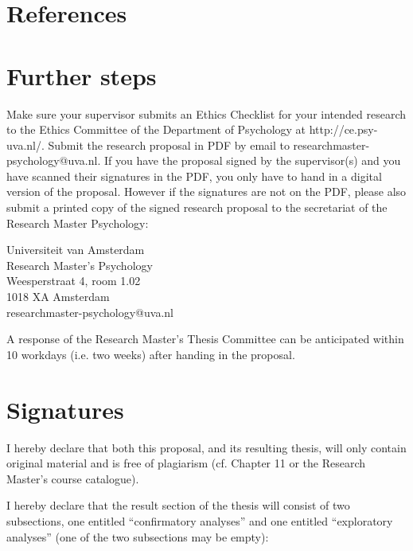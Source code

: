 \documentclass[12pt,a4paper]{article}\usepackage[]{graphicx}\usepackage[]{color}
\begin{document}
\section{References}


\section{Further steps}
Make sure your supervisor submits an Ethics Checklist for your intended research to the Ethics Committee of the Department of Psychology at http://ce.psy-uva.nl/. Submit the research proposal in PDF by email to researchmaster-psychology@uva.nl. 
If you have the proposal signed by the supervisor(s) and you have scanned their signatures in the PDF, you only have to hand in a digital version of the proposal. However if the signatures are not on the PDF, please also submit a printed copy of the signed research proposal to the secretariat of the Research Master Psychology:
\vspace{\baselineskip}

\noindent
Universiteit van Amsterdam \\
Research Master’s Psychology \\
Weesperstraat 4, room 1.02 \\
1018 XA Amsterdam \\
researchmaster-psychology@uva.nl
\vspace{\baselineskip}

\noindent
A response of the Research Master's Thesis Committee can be anticipated within 10 workdays (i.e. two weeks) after handing in the proposal. 

\section{Signatures}
\makebox[0pt][l]{$\square$}\raisebox{.15ex}{\hspace{0.1em}$\checkmark$} I hereby declare that both this proposal, and its resulting thesis, will only contain original material and is free of plagiarism (cf. Chapter 11 or the Research Master's course catalogue).
\vspace{\baselineskip}

\noindent
\makebox[0pt][l]{$\square$}\raisebox{.15ex}{\hspace{0.1em}$\checkmark$} I hereby declare that the result section of the thesis will consist of two subsections, one entitled ``confirmatory analyses'' and one entitled ``exploratory analyses'' (one of the two subsections may be empty):
\end{document}
